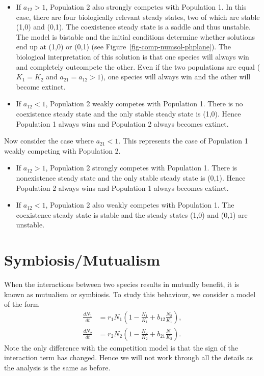 \documentclass[
  letterpaper,
  DIV=11,
  numbers=noendperiod]{scrreprt}
\newcounter{none} %
\providecommand{\tightlist}{%
  \setlength{\itemsep}{0pt}\setlength{\parskip}{0pt}}
\begin{document}
\begin{itemize}
\tightlist
\item
  If \(a_{12}>1\), Population 2 also strongly competes with Population
  1. In this case, there are four biologically relevant steady states,
  two of which are stable (1,0) and (0,1). The coexistence steady state
  is a saddle and thus unstable. The model is bistable and the initial
  conditions determine whether solutions end up at (1,0) or (0,1) (see
  Figure~\ref{fig-comp-numsol-phplane}). The biological interpretation
  of this solution is that one species will always win and completely
  outcompete the other. Even if the two populations are equal
  (\(K_1=K_2\) and \(a_{21}=a_{12}>1\)), one species will always win and
  the other will become extinct.
\item
  If \(a_{12}<1\), Population 2 weakly competes with Population 1. There
  is no coexistence steady state and the only stable steady state is
  (1,0). Hence Population 1 always wins and Population 2 always becomes
  extinct.
\end{itemize}

Now consider the case where \(a_{21}<1\). This represents the case of
Population 1 weakly competing with Population 2.

\begin{itemize}
\tightlist
\item
  If \(a_{12}>1\), Population 2 strongly competes with Population 1.
  There is nonexistence steady state and the only stable steady state is
  (0,1). Hence Population 2 always wins and Population 1 always becomes
  extinct.
\item
  If \(a_{12}<1\), Population 2 also weakly competes with Population 1.
  The coexistence steady state is stable and the steady states (1,0) and
  (0,1) are unstable.
\end{itemize}

\section{Symbiosis/Mutualism}\label{symbiosismutualism}

When the interactions between two species results in mutually benefit,
it is known as mutualism or symbiosis. To study this behaviour, we
consider a model of the form \[
\begin{aligned}
\frac{d N_1}{dt} &= r_1N_1\left(1-\frac{N_1}{K_1}+b_{12}\frac{N_2}{K_1}\right), \nonumber \\
\frac{d N_2}{dt} &= r_2N_2\left(1-\frac{N_2}{K_2}+b_{21}\frac{N_1}{K_2}\right). 
\end{aligned}
\] Note the only difference with the competition model is that the sign
of the interaction term has changed. Hence we will not work through all
the details as the analysis is the same as before.
\end{document}
